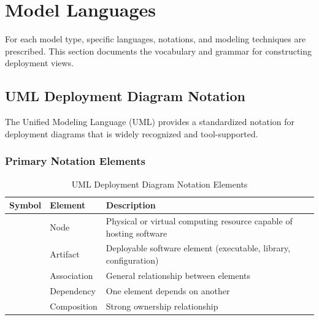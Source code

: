 \documentclass[11pt,letterpaper]{article}
\begin{document}
\section{Model Languages}

For each model type, specific languages, notations, and modeling techniques are prescribed. This section documents the vocabulary and grammar for constructing deployment views.

\subsection{UML Deployment Diagram Notation}

The Unified Modeling Language (UML) provides a standardized notation for deployment diagrams that is widely recognized and tool-supported.

\subsubsection{Primary Notation Elements}

\begin{table}[H]
\centering
\caption{UML Deployment Diagram Notation Elements}
\small
\begin{tabular}{@{}C{3cm}L{4cm}L{6.5cm}@{}}
\toprule
\textbf{Symbol} & \textbf{Element} & \textbf{Description} \\
\midrule
{} & Node & Physical or virtual computing resource capable of hosting software \\
\addlinespace
{} & Artifact & Deployable software element (executable, library, configuration) \\
\addlinespace
{} & Association & General relationship between elements \\
\addlinespace
{} & Dependency & One element depends on another \\
\addlinespace
{} & Composition & Strong ownership relationship \\
\bottomrule
\end{tabular}
\end{table}
\end{document}
